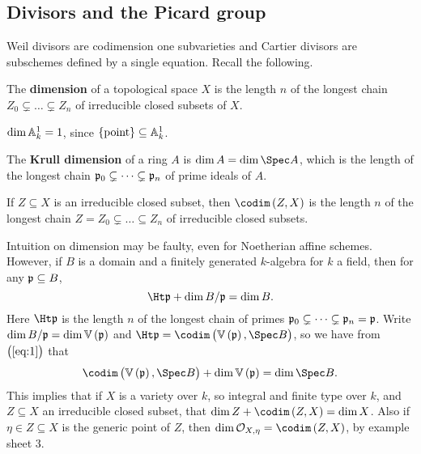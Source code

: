 \subsection{Divisors and the Picard group}

Weil divisors are codimension one subvarieties and Cartier divisors are subschemes defined by a single equation. Recall the following.

\begin{definition*}
The \textbf{dimension} of a topological space $ X $ is the length $ n $ of the longest chain $ Z_0 \subsetneq \dots \subsetneq Z_n $ of irreducible closed subsets of $ X $.
\end{definition*}

\begin{example*}
$ \dim \AA_k^1 = 1 $, since $ \cbr{\text{point}} \subseteq \AA_k^1 $.
\end{example*}

\begin{definition*}
The \textbf{Krull dimension} of a ring $ A $ is $ \dim A = \dim \Spec A $, which is the length of the longest chain $ \ppp_0 \subsetneq \dots \subsetneq \ppp_n $ of prime ideals of $ A $.
\end{definition*}

\begin{definition*}
If $ Z \subseteq X $ is an irreducible closed subset, then $ \codim\br{Z, X} $ is the length $ n $ of the longest chain $ Z = Z_0 \subsetneq \dots \subseteq Z_n $ of irreducible closed subsets.
\end{definition*}

\pagebreak

\begin{remark*}
Intuition on dimension may be faulty, even for Noetherian affine schemes. However, if $ B $ is a domain and a finitely generated $ k $-algebra for $ k $ a field, then for any $ \ppp \subseteq B $,
\begin{equation}
\label{eq:1}
\Ht \ppp + \dim B / \ppp = \dim B.
\end{equation}
Here $ \Ht \ppp $ is the length $ n $ of the longest chain of primes $ \ppp_0 \subsetneq \dots \subsetneq \ppp_n = \ppp $. Write $ \dim B / \ppp = \dim \VV\br{\ppp} $ and $ \Ht \ppp = \codim\br{\VV\br{\ppp}, \Spec B} $, so we have from $ \br{\ref{eq:1}} $ that
$$ \codim\br{\VV\br{\ppp}, \Spec B} + \dim \VV\br{\ppp} = \dim \Spec B. $$
This implies that if $ X $ is a variety over $ k $, so integral and finite type over $ k $, and $ Z \subseteq X $ an irreducible closed subset, that $ \dim Z + \codim\br{Z, X} = \dim X $. Also if $ \eta \in Z \subseteq X $ is the generic point of $ Z $, then $ \dim \OOO_{X, \eta} = \codim\br{Z, X} $, by example sheet $ 3 $.
\end{remark*}

